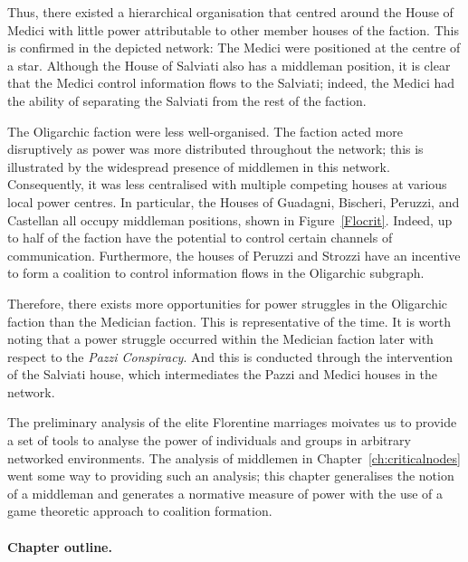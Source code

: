 
Thus, there existed a hierarchical organisation that centred around the House of Medici with little power attributable to other member houses of the faction. This is confirmed in the depicted network: The Medici were positioned at the centre of a star. Although the House of Salviati also has a middleman position, it is clear that the Medici control information flows to the Salviati; indeed, the Medici had the ability of separating the Salviati from the rest of the faction.

The Oligarchic faction were less well-organised. The faction acted more disruptively as power was more distributed throughout the network; this is illustrated by the widespread presence of middlemen in this network. Consequently, it was less centralised with multiple competing houses at various local power centres. In particular, the Houses of Guadagni, Bischeri, Peruzzi, and Castellan all occupy middleman positions, shown in Figure~\ref{Flocrit}. Indeed, up to half of the faction have the potential to control certain channels of communication. Furthermore, the houses of Peruzzi and Strozzi have an incentive to form a coalition to control information flows in the Oligarchic subgraph.

Therefore, there exists more opportunities for power struggles in the Oligarchic faction than the Medician faction. This is representative of the time. It is worth noting that a power struggle occurred within the Medician faction later with respect to the \textit{Pazzi Conspiracy}. And this is conducted through the intervention of the Salviati house, which intermediates the Pazzi and Medici houses in the network.

The preliminary analysis of the elite Florentine marriages moivates us to provide a set of tools to analyse the power of individuals and groups in arbitrary networked environments. The analysis of middlemen in Chapter~\ref{ch:criticalnodes} went some way to providing such an analysis; this chapter generalises the notion of a middleman and generates a normative measure of power with the use of a game theoretic approach to coalition formation.

\paragraph{Chapter outline.}

